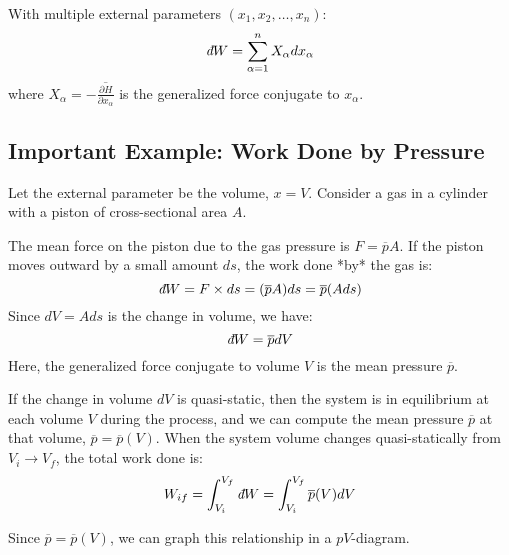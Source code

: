 \documentclass[11pt]{article}
\newcommand{\avg}[1]{\overline{#1}}
\newcommand{\pderiv}[2]{\frac{\partial #1}{\partial #2}}
\newcommand{\ethbar}{\text{\it{đ}}} %
\begin{document}
With multiple external parameters $(x_1, x_2, \dots, x_n)$:
\[ \ethbar W = \sum_{\alpha=1}^n X_\alpha dx_\alpha \]
where $X_\alpha = - \avg{\pderiv{H}{x_\alpha}}$ is the generalized force conjugate to $x_\alpha$.

\subsection*{Important Example: Work Done by Pressure}

Let the external parameter be the volume, $x=V$.
Consider a gas in a cylinder with a piston of cross-sectional area $A$.
\begin{center}
\end{center}
The mean force on the piston due to the gas pressure is $F = \avg{p}A$.
If the piston moves outward by a small amount $ds$, the work done *by* the gas is:
\[ \ethbar W = F \times ds = (\avg{p}A) ds = \avg{p} (A ds) \]
Since $dV = A ds$ is the change in volume, we have:
\[ \ethbar W = \avg{p} dV \]
Here, the generalized force conjugate to volume $V$ is the mean pressure $\avg{p}$.

If the change in volume $dV$ is quasi-static, then the system is in equilibrium at each volume $V$ during the process, and we can compute the mean pressure $\avg{p}$ at that volume, $\avg{p} = \avg{p}(V)$.
When the system volume changes quasi-statically from $V_i \to V_f$, the total work done is:
\[ W_{if} = \int_{V_i}^{V_f} \ethbar W = \int_{V_i}^{V_f} \avg{p}(V) dV \]

Since $\avg{p} = \avg{p}(V)$, we can graph this relationship in a $p V$-diagram.
\end{document}
